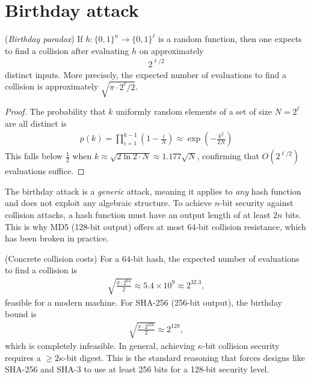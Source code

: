 \documentclass[a4paper, 12pt]{book} %
\begin{document}
\section{Birthday attack}

\begin{theorem}
    (\emph{Birthday paradox})  If $h: \{0,1\}^n \to \{0,1\}^\ell$ is a random function, then one expects to find a collision after evaluating $h$ on approximately
    \begin{align}
        2^{\ell/2}
    \end{align}
    distinct inputs. More precisely, the expected number of evaluations to find a collision is approximately $\sqrt{\pi \cdot 2^\ell / 2}$.
\end{theorem}

\begin{proof}
    The probability that $k$ uniformly random elements of a set of size $N = 2^\ell$ are all distinct is
    \begin{align}
        p(k) = \prod_{i=1}^{k-1} \left(1 - \frac{i}{N}\right) \approx \exp\left(-\frac{k^2}{2N}\right)
    \end{align}
    This falls below $\frac{1}{2}$ when $k \approx \sqrt{2\ln 2 \cdot N} \approx 1.177\sqrt{N}$, confirming that $O(2^{\ell/2})$ evaluations suffice.
\end{proof}

\begin{remark}
    The birthday attack is a \emph{generic} attack, meaning it applies to \emph{any} hash function and does not exploit any algebraic structure. To achieve $n$-bit security against collision attacks, a hash function must have an output length of at least $2n$ bits. This is why MD5 (128-bit output) offers at most 64-bit collision resistance, which has been broken in practice.
\end{remark}

\begin{example}
    (Concrete collision costs) For a $64$-bit hash, the expected number of evaluations to find a collision is
    \begin{align}
        \sqrt{\frac{\pi \cdot 2^{64}}{2}} \approx 5.4 \times 10^9 \approx 2^{32.3},
    \end{align}
    feasible for a modern machine. For SHA-256 (256-bit output), the birthday bound is
    \begin{align}
        \sqrt{\frac{\pi \cdot 2^{256}}{2}} \approx 2^{128},
    \end{align}
    which is completely infeasible. In general, achieving $\kappa$-bit collision security requires a $\geq 2\kappa$-bit digest. This is the standard reasoning that forces designs like SHA-256 and SHA-3 to use at least 256 bits for a 128-bit security level.
\end{example}
\end{document}
